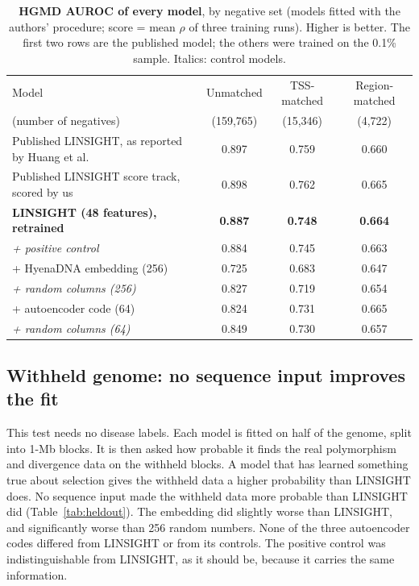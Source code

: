 \documentclass[11pt]{article}
\begin{document}
\begin{table}[t]
\centering\small
\caption{\textbf{HGMD AUROC of every model}, by negative set (models fitted with the authors'
procedure; score = mean $\rho$ of three training runs). Higher is better. The first two rows are the
published model; the others were trained on the 0.1\% sample. Italics: control models.}
\label{tab:hgmd}
\begin{tabular}{@{}lccc@{}}
\toprule
Model & Unmatched & TSS-matched & Region-matched \\
{\footnotesize (number of negatives)} & {\footnotesize (159,765)} & {\footnotesize (15,346)} & {\footnotesize (4,722)} \\
\midrule
Published LINSIGHT, as reported by Huang et al.\ & 0.897 & 0.759 & 0.660 \\
Published LINSIGHT score track, scored by us & 0.898 & 0.762 & 0.665 \\
\textbf{LINSIGHT (48 features), retrained} & \textbf{0.887} & \textbf{0.748} & \textbf{0.664} \\
\quad \emph{+ positive control} & 0.884 & 0.745 & 0.663 \\
\quad + HyenaDNA embedding (256) & 0.725 & 0.683 & 0.647 \\
\quad \emph{+ random columns (256)} & 0.827 & 0.719 & 0.654 \\
\quad + autoencoder code (64) & 0.824 & 0.731 & 0.665 \\
\quad \emph{+ random columns (64)} & 0.849 & 0.730 & 0.657 \\
\bottomrule
\end{tabular}
\end{table}


\subsection*{Withheld genome: no sequence input improves the fit}
This test needs no disease labels. Each model is fitted on half of the genome, split into 1-Mb blocks.
It is then asked how probable it finds the real polymorphism and divergence data on the withheld blocks.
A model that has learned something true about selection gives the withheld data a higher probability
than LINSIGHT does. No sequence input made the withheld data more probable than LINSIGHT did (Table~\ref{tab:heldout}). The
embedding did slightly worse than LINSIGHT, and significantly worse than 256 random numbers. None of the
three autoencoder codes differed from LINSIGHT or from its controls. The positive control was
indistinguishable from LINSIGHT, as it should be, because it carries the same information.
\end{document}
